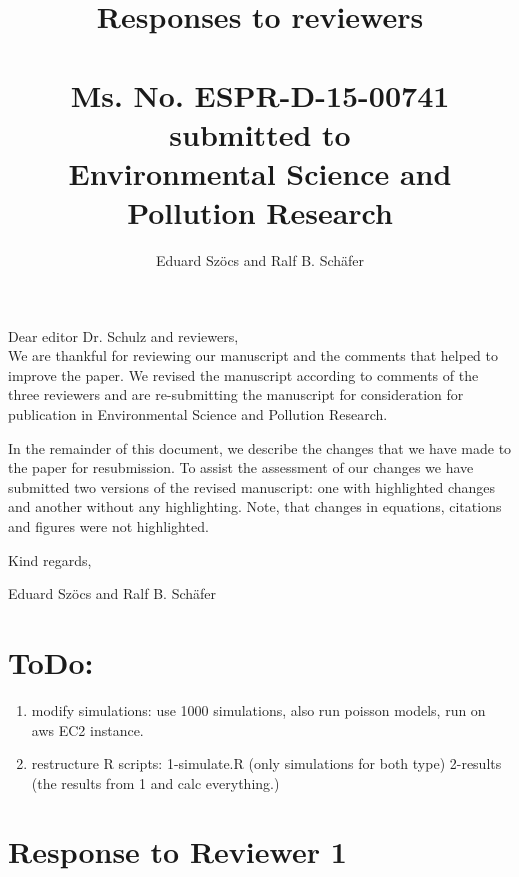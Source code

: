 \documentclass[12pt]{article}
\begin{document}
\title{Responses to reviewers\\~\\Ms. No. ESPR-D-15-00741\\submitted to\\Environmental Science and Pollution Research}

\author{Eduard Szöcs and Ralf B. Schäfer}

\maketitle
\noindent Dear editor Dr. Schulz  and reviewers,\\

We are thankful for reviewing our manuscript and the comments that helped to improve the paper. 
We revised the manuscript according to comments of the three reviewers and are re-submitting the manuscript for consideration for publication in Environmental Science and Pollution Research. 

In the remainder of this document, we describe the changes that we have made to the paper for resubmission. To assist the assessment of our changes we have submitted two versions of the revised manuscript: one with highlighted changes and another without any highlighting. Note, that changes in equations, citations and figures were not highlighted.

\vspace{2em}
\hfill Kind regards,

\hfill Eduard Szöcs and Ralf B. Schäfer

\newpage
\section{ToDo:}
\begin{enumerate}
	\item modify simulations: use 1000 simulations, also run poisson models, run on aws EC2 instance.
	\item restructure R scripts: 1-simulate.R (only simulations for both type) 2-results (the results from 1 and calc everything.)
\end{enumerate}
\section{Response to Reviewer 1}
\end{document}
